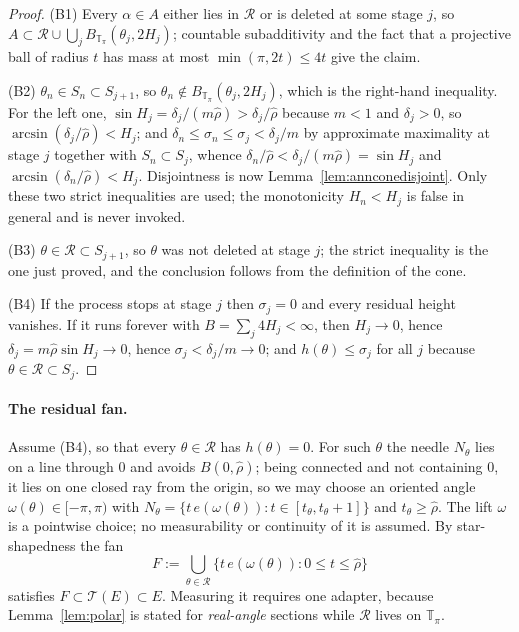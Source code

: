 \documentclass[11pt]{article}
\theoremstyle{plain}
\theoremstyle{definition}
\theoremstyle{remark}
\newcommand{\Tp}{\mathbb{T}_{\pi}}
\newcommand{\Tri}{\mathcal{T}}
\begin{document}
\begin{proof}
(B1) Every $\alpha\in A$ either lies in $\mathcal R$ or is deleted at some
stage $j$, so $A\subset\mathcal R\cup\bigcup_{j}B_{\Tp}(\theta_{j},2H_{j})$;
countable subadditivity and the fact that a projective ball of radius $t$ has
mass at most $\min(\pi,2t)\le4t$ give the claim.

(B2) $\theta_{n}\in S_{n}\subset S_{j+1}$, so
$\theta_{n}\notin B_{\Tp}(\theta_{j},2H_{j})$, which is the right-hand
inequality. For the left one, $\sin H_{j}=\delta_{j}/(m\hat\rho)>
\delta_{j}/\hat\rho$ because $m<1$ and $\delta_{j}>0$, so
$\arcsin(\delta_{j}/\hat\rho)<H_{j}$; and
$\delta_{n}\le\sigma_{n}\le\sigma_{j}<\delta_{j}/m$ by approximate maximality
at stage $j$ together with $S_{n}\subset S_{j}$, whence
$\delta_{n}/\hat\rho<\delta_{j}/(m\hat\rho)=\sin H_{j}$ and
$\arcsin(\delta_{n}/\hat\rho)<H_{j}$. Disjointness is now
Lemma~\ref{lem:annconedisjoint}. Only these two strict inequalities are used;
the monotonicity $H_{n}<H_{j}$ is false in general and is never invoked.

(B3) $\theta\in\mathcal R\subset S_{j+1}$, so $\theta$ was not deleted at stage
$j$; the strict inequality is the one just proved, and the conclusion follows
from the definition of the cone.

(B4) If the process stops at stage $j$ then $\sigma_{j}=0$ and every residual
height vanishes. If it runs forever with $B=\sum_{j}4H_{j}<\infty$, then
$H_{j}\to0$, hence $\delta_{j}=m\hat\rho\sin H_{j}\to0$, hence
$\sigma_{j}<\delta_{j}/m\to0$; and $h(\theta)\le\sigma_{j}$ for all $j$ because
$\theta\in\mathcal R\subset S_{j}$.
\end{proof}

\paragraph{The residual fan.} Assume (B4), so that every $\theta\in\mathcal R$
has $h(\theta)=0$. For such $\theta$ the needle $N_{\theta}$ lies on a line
through $0$ and avoids $B(0,\hat\rho)$; being connected and not containing $0$,
it lies on one closed ray from the origin, so we may choose an oriented angle
$\omega(\theta)\in[-\pi,\pi)$ with
$N_{\theta}=\{t\,e(\omega(\theta)):t\in[t_{\theta},t_{\theta}+1]\}$ and
$t_{\theta}\ge\hat\rho$. The lift $\omega$ is a pointwise choice; no
measurability or continuity of it is assumed. By star-shapedness the fan
\[
  F:=\bigcup_{\theta\in\mathcal R}\{t\,e(\omega(\theta)):0\le t\le\hat\rho\}
\]
satisfies $F\subset\Tri(E)\subset E$. Measuring it requires one adapter,
because Lemma~\ref{lem:polar} is stated for \emph{real-angle} sections while
$\mathcal R$ lives on $\Tp$.
\end{document}
